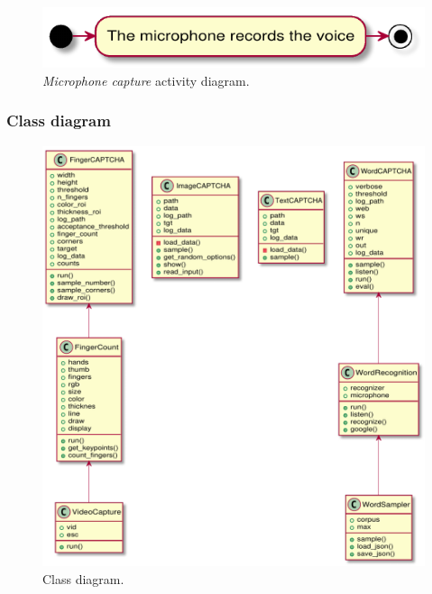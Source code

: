 \begin{figure}[h!t]
    \centering
    \includegraphics[scale=0.8]{assets/plantuml/pdf/activity/microphone.pdf}
    \caption{\emph{Microphone capture} activity diagram.}
    \label{fig:activity:microphone}
\end{figure}

\clearpage
\subsubsection{Class diagram}
\begin{figure}[h!t]
    \centering
    \includegraphics[scale=0.65]{assets/plantuml/pdf/class.pdf}
    \caption{Class diagram.}
    \label{fig:class:diagram}
\end{figure}

\clearpage
